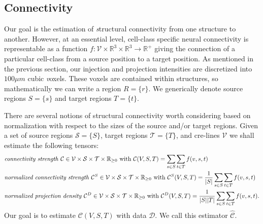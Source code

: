 \documentclass[NETN,manuscript]{stjour-new}
\begin{document}


\subsection{Connectivity}

Our goal is the estimation of {\textit structural connectivity} from one structure to another.
However, at an essential level, cell-class specific neural connectivity is representable as a function $f:  \mathcal V \times \mathbb R^3 \times \mathbb R^3 \to \mathbb R^+$ giving the connection of a particular cell-class from a source position to a target position.
As mentioned in the previous section, our injection and projection intensities are discretized into $100 \mu m$ cubic {\textit voxels}. %
These voxels are contained within structures, so mathematically we can write a region $R= \{r \}$.
We generically denote source regions $S = \{s\}$ and target regions $T = \{t\}$.

There are several notions of structural connectivity worth considering based on normalization with respect to the sizes of the source and/or target regions.
Given a set of source regions $\mathcal S = \{ S\} $, target regions $\mathcal T = \{ T \}$, and cre-lines $\mathcal V$ we shall estimate the following tensors:
\begin{align*}
&\text{\textit {connectivity strength} } \mathcal C \in \mathcal V \times \mathcal S \times \mathcal T \times \mathbb R_{\geq 0}  \text{ with } \mathcal C(V,S,T) = \sum_{s \in S} \sum_{t \in  T} f(v,s,t) \\
&\text{\textit {normalized connectivity strength} } \mathcal C^S \in \mathcal V \times \mathcal S \times \mathcal T \times \mathbb R_{\geq 0}  \text{ with } \mathcal C^S(V,S,T) = \frac{1}{|S|} \sum_{s \in  S} \sum_{t \in  T} f(v,s,t) \\
&\text{\textit {normalized projection density} } \mathcal C^D \in \mathcal V \times \mathcal S \times \mathcal T \times \mathbb R_{\geq 0} \text{ with } \mathcal C^D(V,S,T) = \frac{1}{| S | | T|} \sum_{s \in S} \sum_{t \in T} f(v,s,t).
\end{align*}
Our goal is to estimate $\mathcal C (V,S,T)$ with data $\mathcal D$.
We call this estimator $\widehat { \mathcal C } $.
\end{document}
